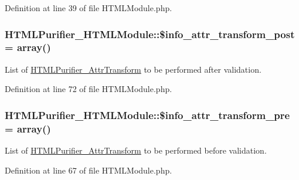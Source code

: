 Definition at line 39 of file H\+T\+M\+L\+Module.\+php.

\hypertarget{classHTMLPurifier__HTMLModule_aef22ceb521086ceea23c408cd4974c40}{
\subsubsection[{\$info\+\_\+attr\+\_\+transform\+\_\+post}]{\setlength{\rightskip}{0pt plus 5cm}H\+T\+M\+L\+Purifier\+\_\+\+H\+T\+M\+L\+Module\+::\$info\+\_\+attr\+\_\+transform\+\_\+post = array()}}\label{classHTMLPurifier__HTMLModule_aef22ceb521086ceea23c408cd4974c40}
List of \hyperlink{classHTMLPurifier__AttrTransform}{H\+T\+M\+L\+Purifier\+\_\+\+Attr\+Transform} to be performed after validation. 

Definition at line 72 of file H\+T\+M\+L\+Module.\+php.

\hypertarget{classHTMLPurifier__HTMLModule_a8360302f80672ee91e38609982ee3e96}{
\subsubsection[{\$info\+\_\+attr\+\_\+transform\+\_\+pre}]{\setlength{\rightskip}{0pt plus 5cm}H\+T\+M\+L\+Purifier\+\_\+\+H\+T\+M\+L\+Module\+::\$info\+\_\+attr\+\_\+transform\+\_\+pre = array()}}\label{classHTMLPurifier__HTMLModule_a8360302f80672ee91e38609982ee3e96}
List of \hyperlink{classHTMLPurifier__AttrTransform}{H\+T\+M\+L\+Purifier\+\_\+\+Attr\+Transform} to be performed before validation. 

Definition at line 67 of file H\+T\+M\+L\+Module.\+php.

